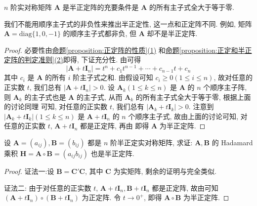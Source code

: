 \documentclass[../../main.tex]{subfiles}
\begin{document}
\begin{proposition}\label{proposition:半正定阵关于顺序主子式的性质}
\(n\) 阶实对称矩阵 \(\boldsymbol{A}\) 是半正定阵的充要条件是 \(\boldsymbol{A}\) 的所有主子式全大于等于零.
\end{proposition}
\begin{remark}
我们不能用顺序主子式的非负性来推出半正定性, 这一点和正定阵不同. 例如, 矩阵 \(\boldsymbol{A}=\text{diag}\{1,0,-1\}\) 的顺序主子式都非负, 但 \(\boldsymbol{A}\) 却不是半正定阵. 
\end{remark}
\begin{proof}
必要性由\hyperref[proposition:正定阵的性质]{命题\ref{proposition:正定阵的性质}(1)} 和\hyperref[proposition:正定和半正定阵的判定准则]{命题\ref{proposition:正定和半正定阵的判定准则}(2)}即得, 下证充分性. 由可得
\[|\boldsymbol{A}+t\boldsymbol{I}_n|=t^n + c_1t^{n - 1}+\cdots + c_{n - 1}t + c_n\]
其中 \(c_i\) 是 \(\boldsymbol{A}\) 的所有 \(i\) 阶主子式之和. 由假设可知 \(c_i\geq0(1\leq i\leq n)\), 故对任意的正实数 \(t\), 我们总有 \(|\boldsymbol{A}+t\boldsymbol{I}_n|>0\). 设 \(\boldsymbol{A}_k(1\leq k\leq n)\) 是 \(\boldsymbol{A}\) 的 \(n\) 个顺序主子阵, 则 \(\boldsymbol{A}_k\) 的主子式也是 \(\boldsymbol{A}\) 的主子式, 从而 \(\boldsymbol{A}_k\) 的所有主子式全大于等于零, 根据上面的讨论同理 可知, 对任意的正实数 \(t\), 我们总有 \(|\boldsymbol{A}_k + t\boldsymbol{I}_k|>0\). 注意到 \(|\boldsymbol{A}_k + t\boldsymbol{I}_k|(1\leq k\leq n)\) 是 \(\boldsymbol{A}+t\boldsymbol{I}_n\) 的 \(n\) 个顺序主子式, 故由上面的讨论可知, 对任意的正实数 \(t\), \(\boldsymbol{A}+t\boldsymbol{I}_n\) 都是正定阵, 再由 即得 \(\boldsymbol{A}\) 为半正定阵. 
\end{proof}

\begin{proposition}\label{proposition:半正定阵的Hadamard乘积性质}
设 \(\boldsymbol{A}=(a_{ij}),\boldsymbol{B}=(b_{ij})\) 都是 \(n\) 阶半正定实对称矩阵, 求证: \(\boldsymbol{A},\boldsymbol{B}\) 的 Hadamard 乘积 \(\boldsymbol{H}=\boldsymbol{A}\circ\boldsymbol{B}=(a_{ij}b_{ij})\) 也是半正定阵.
\end{proposition}
\begin{proof}
{\color{blue}证法一:}设 \(\boldsymbol{B}=\boldsymbol{C}'\boldsymbol{C}\), 其中 \(\boldsymbol{C}\) 为实矩阵, 剩余的证明与完全类似.

{\color{blue}证法二:} 由于对任意的正实数 \(t\), \(\boldsymbol{A}+t\boldsymbol{I}_n,\boldsymbol{B}+t\boldsymbol{I}_n\) 都是正定阵, 故由可知 \((\boldsymbol{A}+t\boldsymbol{I}_n)\circ(\boldsymbol{B}+t\boldsymbol{I}_n)\) 为正定阵. 令 \(t\to0^+\), 即得 \(\boldsymbol{A}\circ\boldsymbol{B}\) 为半正定阵.
\end{proof}
\end{document}
